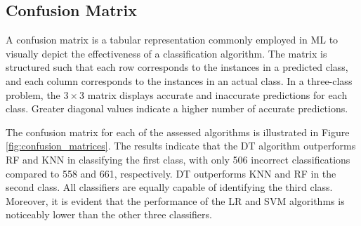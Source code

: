 \documentclass[conference]{IEEEtran}
\begin{document}
\subsection{Confusion Matrix}
A confusion matrix is a tabular representation commonly employed in ML to visually depict the effectiveness of a classification algorithm. The matrix is structured such that each row corresponds to the instances in a predicted class, and each column corresponds to the instances in an actual class. In a three-class problem, the $3\times3$ matrix displays accurate and inaccurate predictions for each class. Greater diagonal values indicate a higher number of accurate predictions. 

The confusion matrix for each of the assessed algorithms is illustrated in Figure \ref{fig:confusion_matrices}. The results indicate that the DT algorithm outperforms RF and KNN in classifying the first class, with only 506 incorrect classifications compared to 558 and 661, respectively. DT outperforms KNN and RF in the second class. All classifiers are equally capable of identifying the third class. Moreover, it is evident that the performance of the LR and SVM algorithms is noticeably lower than the other three classifiers.
\end{document}

